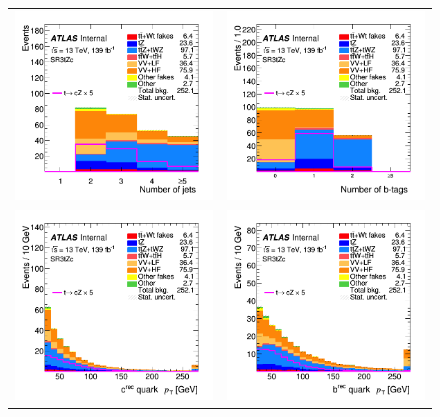 \begin{figure}[htbp]
	\centering
	\begin{tabular}{cc}
		\includegraphics[width=.45\textwidth]{Chapters/CH5/figures/SR3_UsingSMT/nJets} &
	    \includegraphics[width=.45\textwidth]{Chapters/CH5/figures/SR3_UsingSMT/nbJets}\\
		\includegraphics[width=.45\textwidth]{Chapters/CH5/figures/SR3_UsingSMT/q_pt} &
		\includegraphics[width=.45\textwidth]{Chapters/CH5/figures/SR3_UsingSMT/b_pt} \\

\end{tabular}
\end{figure}
